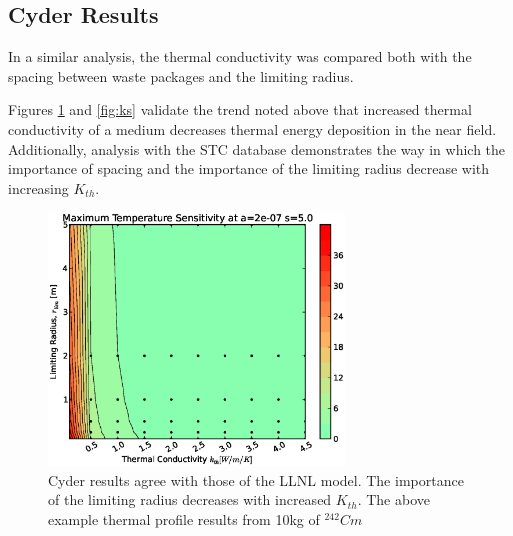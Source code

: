 \FloatBarrier
\subsection{Cyder Results}

In a similar analysis, the thermal conductivity was compared both with the 
spacing between waste packages and the limiting radius. 

Figures \ref{fig:kr} and \ref{fig:ks} validate the trend noted above that 
increased thermal conductivity of a medium decreases thermal energy deposition 
in the near field.  Additionally, analysis with the \Cyder STC database 
demonstrates the way in which the importance of spacing and the importance of 
the limiting radius decrease with increasing $K_{th}$.

\begin{figure}[htbp!]
\begin{center}
\includegraphics[width=0.7\textwidth]{./chapters/demonstration/conductivity/kr.eps}
\end{center}
\caption[$K_{th}$ vs. $r_{lim}$ Sensitivity in Cyder]
{Cyder results agree with 
those of the LLNL model. The importance of the limiting radius decreases with 
increased $K_{th}$. The above example thermal profile results from 10kg of 
$^{242}Cm$}
\label{fig:kr}
\end{figure}

